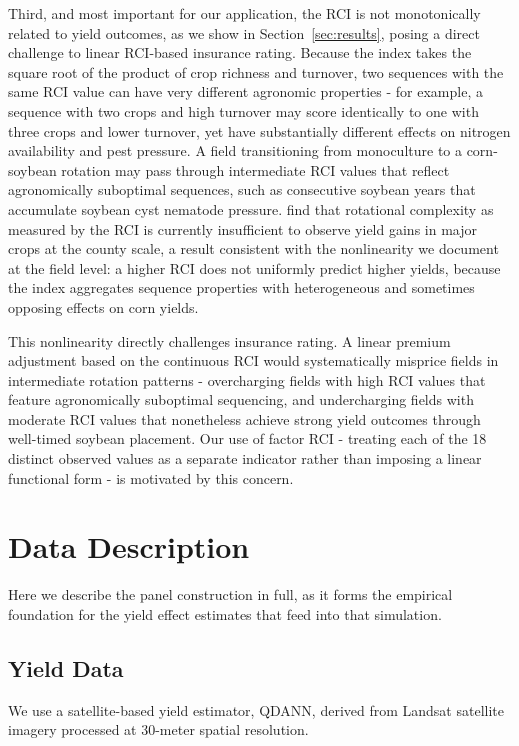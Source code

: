 \documentclass[12pt,letterpaper]{article}
\theoremstyle{remark}
\theoremstyle{remark}
\theoremstyle{plain}
\theoremstyle{definition}
\begin{document}
Third, and most important for our application, the RCI is not monotonically related to yield outcomes, as we show in Section~\ref{sec:results}, posing a direct challenge to linear RCI-based insurance rating. Because the index takes the square root of the product of crop richness and turnover, two sequences with the same RCI value can have very different agronomic properties - for example, a sequence with two crops and high turnover may score identically to one with three crops and lower turnover, yet have substantially different effects on nitrogen availability and pest pressure. A field transitioning from monoculture to a corn-soybean rotation may pass through intermediate RCI values that reflect agronomically suboptimal sequences, such as consecutive soybean years that accumulate soybean cyst nematode pressure. \citet{burchfield2024} find that rotational complexity as measured by the RCI is currently insufficient to observe yield gains in major crops at the county scale, a result consistent with the nonlinearity we document at the field level: a higher RCI does not uniformly predict higher yields, because the index aggregates sequence properties with heterogeneous and sometimes opposing effects on corn yields.

This nonlinearity directly challenges insurance rating. A linear premium adjustment based on the continuous RCI would systematically misprice fields in intermediate rotation patterns - overcharging fields with high RCI values that feature agronomically suboptimal sequencing, and undercharging fields with moderate RCI values that nonetheless achieve strong yield outcomes through well-timed soybean placement. Our use of factor RCI - treating each of the 18 distinct observed values as a separate indicator rather than imposing a linear functional form - is motivated by this concern. 

\section{\label{sec:data}Data Description}

Here we describe the panel construction in full, as it forms the empirical foundation for the yield effect estimates that feed into that simulation.

\subsection{\label{subsec:yield}Yield Data}
We use a satellite-based yield estimator, QDANN, derived from Landsat satellite imagery processed at 30-meter spatial resolution.
\end{document}
